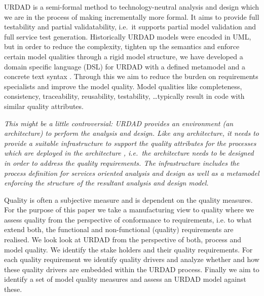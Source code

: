 URDAD is a semi-formal method to technology-neutral analysis and design \cite{solms_urdad_2010} which we are in the process of making incrementally more formal. It aims to provide full testability and partial validatability, i.e.\ it supports partial model validation and full service test generation. Historically URDAD models were encoded in UML, but in order to reduce the complexity, tighten up the semantics and enforce certain model qualities through a rigid model structure, we have developed a domain specific language (DSL) for URDAD with a defined metamodel and a concrete text syntax \cite{solmsfritz_domain-specific_????}. Through this we aim to reduce the burden on requirements specialists and improve the model quality. Model qualities like completeness, consistency, traceability, reusability, testability, \dots typically result in code with similar quality attributes\cite{findItIfYouCan}.

\emph{This might be a little controversial: URDAD provides an environment (an architecture) to perform the analysis and design. Like any architecture, it needs to provide a suitable infrastructure to support the quality attributes for the processes which are deployed in the architecture \cite{}, i.e.\ the architecture needs to be designed in order to address the quality requirements. The infrastructure includes the process definition for services oriented analysis and design as well as a metamodel enforcing the structure of the resultant analysis and design model.}

Quality is often a subjective measure and is dependent on the quality measures. For the purpose of this paper we take a manufacturing view \cite{garvin_what_1984} to quality where we assess quality from the perspective of conformance to requirements, i.e. to what extend both, the functional and non-functional (quality) requirements are realised. We look look at URDAD from the perspective of both, process and model quality. We identify the stake holders and their quality requirements. For each quality requirement we identify quality drivers and analyze whether and how these quality drivers are embedded within the URDAD process. Finally we aim to identify a set of model quality measures and assess an URDAD model against these.


